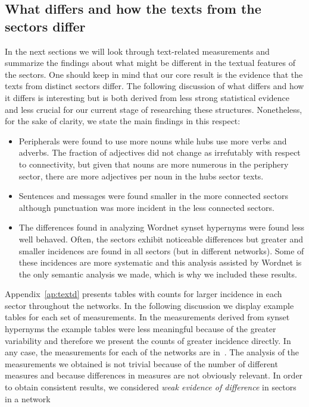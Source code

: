  \FloatBarrier
 \subsection{What differs and how the texts from the sectors differ}
 In the next sections we will look through text-related measurements
 and summarize the findings about what might be different in
 the textual features of the sectors.
 One should keep in mind that our core result is the evidence that
 the texts from distinct sectors differ.
 The following discussion of what differs and how it differs
 is interesting but is both derived from less strong statistical evidence and less crucial for our current stage of researching these structures.
 Nonetheless, for the sake of clarity, we state the main findings in this respect:
 \begin{itemize}
\item Peripherals were found to use more nouns while hubs use more verbs and adverbs. The fraction of adjectives did not change as irrefutably with respect to connectivity, but given that nouns are more numerous in the periphery sector, there are more adjectives per noun in the hubs sector texts.
\item Sentences and messages were found smaller in the more connected sectors although punctuation was more incident in the less connected sectors.
\item The differences found in analyzing Wordnet synset hypernyms were found less well behaved. Often, the sectors exhibit noticeable differences but greater and smaller incidences are found in all sectors (but in different networks). Some of these incidences are more systematic and this analysis assisted by Wordnet is the only semantic analysis we made, which is why we included these results.
\end{itemize}
Appendix~\ref{ap:textd} presents tables with counts for larger incidence in each sector throughout the networks. In the following discussion we display example tables for each set of measurements.
In the measurements derived from synset hypernyms the example tables were less meaningful because of the greater variability and therefore we present the counts of greater incidence directly.
In any case, the measurements for each of the networks are in~\cite{textTables}.
The analysis of the measurements we obtained
is not trivial because of the number of different measures
and because differences in measures are not obviously relevant.
In order to obtain consistent results, we considered \emph{weak evidence of difference} in sectors in a network
